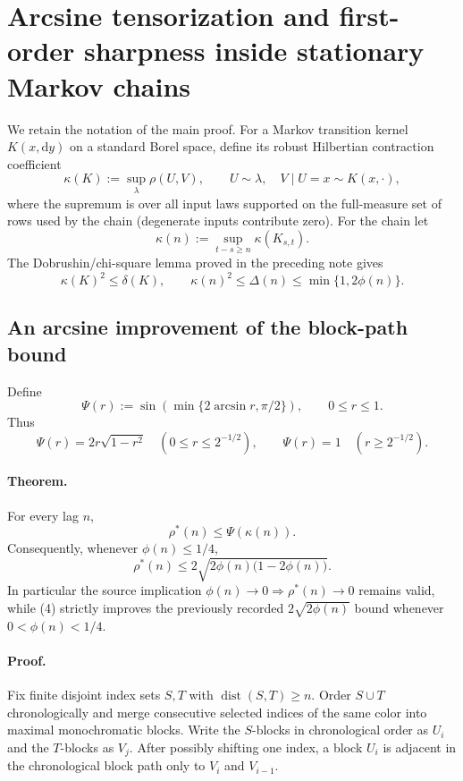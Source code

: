 
\section{Arcsine tensorization and first-order sharpness inside stationary Markov chains}

We retain the notation of the main proof.  For a Markov transition kernel
$K(x,\mathrm dy)$ on a standard Borel space, define its robust Hilbertian
contraction coefficient
\[
 \kappa(K):=\sup_{\lambda}\rho(U,V),
 \qquad U\sim\lambda,\quad V\mid U=x\sim K(x,\cdot),
\]
where the supremum is over all input laws supported on the full-measure set of
rows used by the chain (degenerate inputs contribute zero).  For the chain let
\[
 \kappa(n):=\sup_{t-s\ge n}\kappa(K_{s,t}).
\]
The Dobrushin/chi-square lemma proved in the preceding note gives
\[
 \kappa(K)^2\le \delta(K),
 \qquad
 \kappa(n)^2\le \Delta(n)\le \min\{1,2\phi(n)\}.
\tag{1}
\]

\subsection{An arcsine improvement of the block-path bound}

Define
\[
 \Psi(r):=\sin\!\left(\min\{2\arcsin r,\pi/2\}\right),\qquad 0\le r\le1.
\]
Thus
\[
 \Psi(r)=2r\sqrt{1-r^2}\quad(0\le r\le 2^{-1/2}),
 \qquad \Psi(r)=1\quad(r\ge2^{-1/2}).
\tag{2}
\]

\paragraph{Theorem.}
For every lag $n$,
\[
 \boxed{\rho^*(n)\le \Psi(\kappa(n)).}
\tag{3}
\]
Consequently, whenever $\phi(n)\le1/4$,
\[
 \boxed{\rho^*(n)\le
  2\sqrt{2\phi(n)\bigl(1-2\phi(n)\bigr)}.}
\tag{4}
\]
In particular the source implication $\phi(n)\to0\Rightarrow\rho^*(n)\to0$
remains valid, while (4) strictly improves the previously recorded
$2\sqrt{2\phi(n)}$ bound whenever $0<\phi(n)<1/4$.

\paragraph{Proof.}
Fix finite disjoint index sets $S,T$ with $\operatorname{dist}(S,T)\ge n$.
Order $S\cup T$ chronologically and merge consecutive selected indices of the
same color into maximal monochromatic blocks.  Write the $S$-blocks in
chronological order as $U_i$ and the $T$-blocks as $V_j$.  After possibly
shifting one index, a block $U_i$ is adjacent in the chronological block path
only to $V_i$ and $V_{i-1}$.

